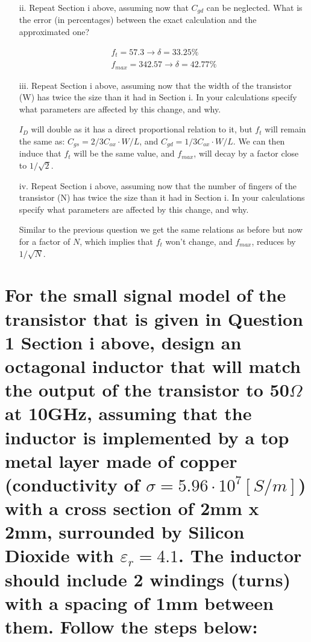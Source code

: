 \documentclass[12pt, letterpaper]{article}
\begin{document}
\begin{itemize}
  \item [ii.] Repeat Section i above, assuming now that $C_{gd}$ can be neglected. What is the error (in percentages) between the exact calculation and the approximated one?

  \begin{align}
    f_t=57.3\rightarrow \delta=33.25\%
    \\
    f_{max}=342.57\rightarrow \delta=42.77\%
  \end{align}

  \item [iii.] Repeat Section i above, assuming now that the width of the transistor (W) has twice the size than it had in Section i. In your calculations specify what parameters are affected by this change, and why.

  {\color{blue} $I_D$ will double as it has a direct proportional relation to it, but $f_t$ will remain the same as: $C_{gs}=2/3C_{ox}\cdot W/L$, and $C_{gd}=1/3C_{ox}\cdot W/L$. We can then induce that $f_t$ will be the same value, and $f_{max}$, will decay by a factor close to $1/\sqrt{2}$.}

  \item [iv.] Repeat Section i above, assuming now that the number of fingers of the transistor (N) has twice the size than it had in Section i. In your calculations specify what parameters are affected by this change, and why.
  
  {\color{blue}Similar to the previous question we get the same relations as before but now for a factor of $N$, which implies that $f_t$ won't change, and $f_{max}$, reduces by $1/\sqrt{N}$.}
\end{itemize}

\section{For the small signal model of the transistor that is given in Question 1 Section i above, design an octagonal inductor that will match the output of the transistor to 50$\Omega$ at 10GHz, assuming that the inductor is implemented by a top metal layer made of copper (conductivity of $\sigma=5.96\cdot10^7 [S/m]$) with a cross section of 2mm x 2mm, surrounded by Silicon Dioxide with $\varepsilon_r=4.1$. The inductor should include 2 windings (turns) with a spacing of 1mm between them. Follow the steps below:}
\end{document}
